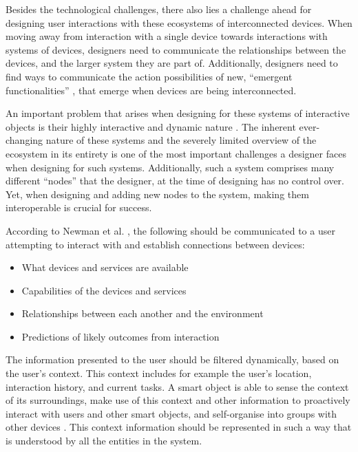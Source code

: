 Besides the technological challenges, there also lies a challenge ahead for designing user interactions with these ecosystems of interconnected devices. When moving away from interaction with a single device towards interactions with systems of devices, designers need to communicate the relationships between the devices, and the larger system they are part of. Additionally, designers need to find ways to communicate the action possibilities of new, ``emergent functionalities'' \cite{Frens2009}, that emerge when devices are being interconnected. 

An important problem that arises when designing for these systems of interactive objects is their highly interactive and dynamic nature \cite{Frens2009}. The inherent ever-changing nature of these systems and the severely limited overview of the ecosystem in its entirety is one of the most important challenges a designer faces when designing for such systems. Additionally, such a system comprises many different ``nodes'' that the designer, at the time of designing has no control over. Yet, when designing and adding new nodes to the system, making them interoperable is crucial for success. 

According to Newman et al. \cite{Newman2002}, the following should be communicated to a user attempting to interact with and establish connections between devices:
\begin{itemize}
\item What devices and services are available
\item Capabilities of the devices and services
\item Relationships between each another and the environment
\item Predictions of likely outcomes from interaction
\end{itemize}

The information presented to the user should be filtered dynamically, based on the user's context. This context includes for example the user's location, interaction history, and current tasks. A smart object is able to sense the context of its surroundings, make use of this context and other information to proactively interact with users and other smart objects, and self-organise into groups with other devices \cite{Sabou2010}. This context information should be represented in such a way that is understood by all the entities in the system. 


